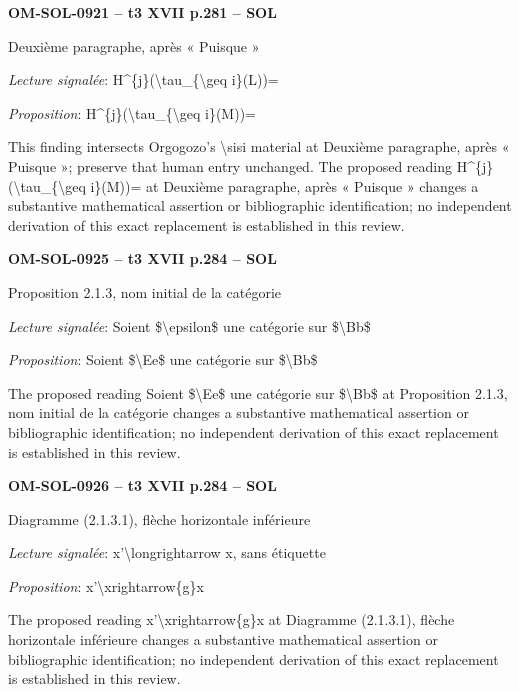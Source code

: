 \par\noindent\textbf{OM-SOL-0921 -- t3 XVII p.281 -- SOL}\par
Deuxième paragraphe, après « Puisque »\par
\emph{Lecture signalée}: H\textasciicircum{}\{j\}(\textbackslash{}tau\_\{\textbackslash{}geq i\}(L))=\par
\emph{Proposition}: H\textasciicircum{}\{j\}(\textbackslash{}tau\_\{\textbackslash{}geq i\}(M))=\par
This finding intersects Orgogozo's \textbackslash{}sisi material at Deuxième paragraphe, après « Puisque »; preserve that human entry unchanged. The proposed reading H\textasciicircum{}\{j\}(\textbackslash{}tau\_\{\textbackslash{}geq i\}(M))= at Deuxième paragraphe, après « Puisque » changes a substantive mathematical assertion or bibliographic identification; no independent derivation of this exact replacement is established in this review.\par
\par\noindent\textbf{OM-SOL-0925 -- t3 XVII p.284 -- SOL}\par
Proposition 2.1.3, nom initial de la catégorie\par
\emph{Lecture signalée}: Soient \$\textbackslash{}epsilon\$ une catégorie sur \$\textbackslash{}Bb\$\par
\emph{Proposition}: Soient \$\textbackslash{}Ee\$ une catégorie sur \$\textbackslash{}Bb\$\par
The proposed reading Soient \$\textbackslash{}Ee\$ une catégorie sur \$\textbackslash{}Bb\$ at Proposition 2.1.3, nom initial de la catégorie changes a substantive mathematical assertion or bibliographic identification; no independent derivation of this exact replacement is established in this review.\par
\par\noindent\textbf{OM-SOL-0926 -- t3 XVII p.284 -- SOL}\par
Diagramme (2.1.3.1), flèche horizontale inférieure\par
\emph{Lecture signalée}: x'\textbackslash{}longrightarrow x, sans étiquette\par
\emph{Proposition}: x'\textbackslash{}xrightarrow\{g\}x\par
The proposed reading x'\textbackslash{}xrightarrow\{g\}x at Diagramme (2.1.3.1), flèche horizontale inférieure changes a substantive mathematical assertion or bibliographic identification; no independent derivation of this exact replacement is established in this review.\par
